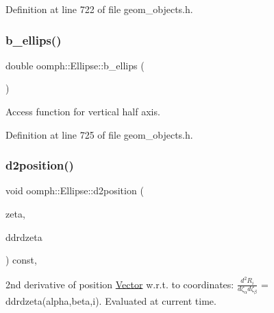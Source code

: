 Definition at line 722 of file geom\+\_\+objects.\+h.

\mbox{\label{classoomph_1_1Ellipse_aad24496ce678eea77c602c52d9eaa9a5}} 
\subsubsection{\texorpdfstring{b\+\_\+ellips()}{b\_ellips()}}
{\footnotesize\ttfamily double oomph\+::\+Ellipse\+::b\+\_\+ellips (\begin{DoxyParamCaption}{ }\end{DoxyParamCaption})\hspace{0.3cm}{\ttfamily [inline]}}



Access function for vertical half axis. 



Definition at line 725 of file geom\+\_\+objects.\+h.

\mbox{\label{classoomph_1_1Ellipse_a19b6cecd9fcbcad1830a8a3c1e133672}} 
\subsubsection{\texorpdfstring{d2position()}{d2position()}\hspace{0.1cm}{\footnotesize\ttfamily [1/2]}}
{\footnotesize\ttfamily void oomph\+::\+Ellipse\+::d2position (\begin{DoxyParamCaption}\item[{const \hyperlink{classoomph_1_1Vector}{Vector}$<$ double $>$ \&}]{zeta,  }\item[{\hyperlink{classoomph_1_1RankThreeTensor}{Rank\+Three\+Tensor}$<$ double $>$ \&}]{ddrdzeta }\end{DoxyParamCaption}) const\hspace{0.3cm}{\ttfamily [inline]}, {\ttfamily [virtual]}}



2nd derivative of position \hyperlink{classoomph_1_1Vector}{Vector} w.\+r.\+t. to coordinates\+: $ \frac{d^2R_i}{d \zeta_\alpha d \zeta_\beta}$ = ddrdzeta(alpha,beta,i). Evaluated at current time. 



